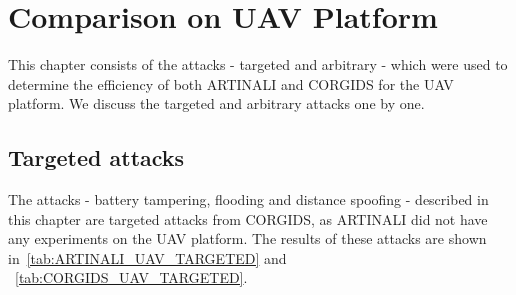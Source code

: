 \section{Comparison on \ac{UAV} Platform}
This chapter consists of the attacks - targeted and arbitrary - which were used to determine the efficiency of both ARTINALI and \ac{CORGIDS} for the \ac{UAV} platform. We discuss the targeted and arbitrary attacks one by one.


\subsection{Targeted attacks}
The attacks - battery tampering, flooding and distance spoofing - described in this chapter are targeted attacks from \ac{CORGIDS}, as ARTINALI did not have any experiments on the \ac{UAV} platform.
The results of these attacks are shown in~\autoref{tab:ARTINALI_UAV_TARGETED} and ~\autoref{tab:CORGIDS_UAV_TARGETED}.

\begin{table}
\centering
  \caption{Results of intrusion detection by ARTINALI for Targeted attacks on \ac{UAV} platform}
  \label{tab:ARTINALI_UAV_TARGETED}
\end{table}

\begin{table}
\centering
  \caption{Results of intrusion detection by \ac{CORGIDS} for Targeted attacks on \ac{UAV} platform}
  \label{tab:CORGIDS_UAV_TARGETED}
\end{table}

